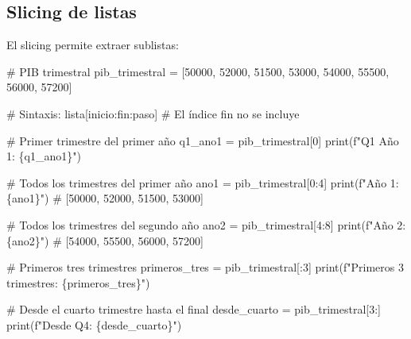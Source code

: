 \documentclass[
  doc,
  floatsintext,
  longtable,
  a4paper,
  nolmodern,
  notxfonts,
  notimes,
  12pt,
  colorlinks=true,linkcolor=blue,citecolor=blue,urlcolor=blue]{apa7}
\newenvironment{Shaded}{\begin{snugshade}}{\end{snugshade}}
\newcommand{\BuiltInTok}[1]{\textcolor[rgb]{0.00,0.23,0.31}{#1}}
\newcommand{\CommentTok}[1]{\textcolor[rgb]{0.37,0.37,0.37}{#1}}
\newcommand{\DecValTok}[1]{\textcolor[rgb]{0.68,0.00,0.00}{#1}}
\newcommand{\NormalTok}[1]{\textcolor[rgb]{0.00,0.23,0.31}{#1}}
\newcommand{\OperatorTok}[1]{\textcolor[rgb]{0.37,0.37,0.37}{#1}}
\newcommand{\SpecialCharTok}[1]{\textcolor[rgb]{0.37,0.37,0.37}{#1}}
\newcommand{\SpecialStringTok}[1]{\textcolor[rgb]{0.13,0.47,0.30}{#1}}
\begin{document}
\subsection{Slicing de listas}\label{slicing-de-listas}

El slicing permite extraer sublistas:

\begin{Shaded}
\begin{Highlighting}[]
\CommentTok{\# PIB trimestral}
\NormalTok{pib\_trimestral }\OperatorTok{=}\NormalTok{ [}\DecValTok{50000}\NormalTok{, }\DecValTok{52000}\NormalTok{, }\DecValTok{51500}\NormalTok{, }\DecValTok{53000}\NormalTok{, }\DecValTok{54000}\NormalTok{, }\DecValTok{55500}\NormalTok{, }\DecValTok{56000}\NormalTok{, }\DecValTok{57200}\NormalTok{]}

\CommentTok{\# Sintaxis: lista[inicio:fin:paso]}
\CommentTok{\# El índice \textquotesingle{}fin\textquotesingle{} no se incluye}

\CommentTok{\# Primer trimestre del primer año}
\NormalTok{q1\_ano1 }\OperatorTok{=}\NormalTok{ pib\_trimestral[}\DecValTok{0}\NormalTok{]}
\BuiltInTok{print}\NormalTok{(}\SpecialStringTok{f"Q1 Año 1: }\SpecialCharTok{\{}\NormalTok{q1\_ano1}\SpecialCharTok{\}}\SpecialStringTok{"}\NormalTok{)}

\CommentTok{\# Todos los trimestres del primer año}
\NormalTok{ano1 }\OperatorTok{=}\NormalTok{ pib\_trimestral[}\DecValTok{0}\NormalTok{:}\DecValTok{4}\NormalTok{]}
\BuiltInTok{print}\NormalTok{(}\SpecialStringTok{f"Año 1: }\SpecialCharTok{\{}\NormalTok{ano1}\SpecialCharTok{\}}\SpecialStringTok{"}\NormalTok{)  }\CommentTok{\# [50000, 52000, 51500, 53000]}

\CommentTok{\# Todos los trimestres del segundo año}
\NormalTok{ano2 }\OperatorTok{=}\NormalTok{ pib\_trimestral[}\DecValTok{4}\NormalTok{:}\DecValTok{8}\NormalTok{]}
\BuiltInTok{print}\NormalTok{(}\SpecialStringTok{f"Año 2: }\SpecialCharTok{\{}\NormalTok{ano2}\SpecialCharTok{\}}\SpecialStringTok{"}\NormalTok{)  }\CommentTok{\# [54000, 55500, 56000, 57200]}

\CommentTok{\# Primeros tres trimestres}
\NormalTok{primeros\_tres }\OperatorTok{=}\NormalTok{ pib\_trimestral[:}\DecValTok{3}\NormalTok{]}
\BuiltInTok{print}\NormalTok{(}\SpecialStringTok{f"Primeros 3 trimestres: }\SpecialCharTok{\{}\NormalTok{primeros\_tres}\SpecialCharTok{\}}\SpecialStringTok{"}\NormalTok{)}

\CommentTok{\# Desde el cuarto trimestre hasta el final}
\NormalTok{desde\_cuarto }\OperatorTok{=}\NormalTok{ pib\_trimestral[}\DecValTok{3}\NormalTok{:]}
\BuiltInTok{print}\NormalTok{(}\SpecialStringTok{f"Desde Q4: }\SpecialCharTok{\{}\NormalTok{desde\_cuarto}\SpecialCharTok{\}}\SpecialStringTok{"}\NormalTok{)}


\end{Highlighting}
\end{Shaded}
\end{document}
